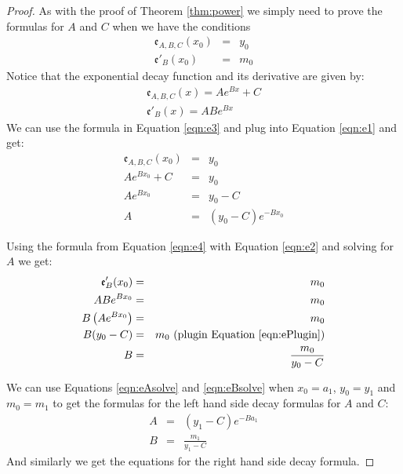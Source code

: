 \documentclass[10pt]{article}
\begin{document}
\begin{proof}
As with the proof of Theorem \ref{thm:power} we simply need to prove the
formulas for $A$ and $C$ when we have the conditions
\begin{eqnarray}
\mathfrak{e}_{A,B,C}(x_0) &=& y_0 \label{eqn:e1}\\
\mathfrak{e}'_{B}(x_0) &=& m_0 \label{eqn:e2}
\end{eqnarray}
Notice that the exponential decay function and its derivative are given by:
\begin{eqnarray}
\mathfrak{e}_{A,B,C}(x) = Ae^{Bx}+C \label{eqn:e3}\\
\mathfrak{e}'_{B}(x) = ABe^{Bx} \label{eqn:e4}
\end{eqnarray}
We can use the formula in Equation \ref{eqn:e3} and plug into Equation \ref{eqn:e1}
and get:
\begin{eqnarray}
\mathfrak{e}_{A,B,C}(x_0) &=& y_0 \\
Ae^{Bx_0} + C &=& y_0 \\
Ae^{Bx_0} &=& y_0 - C \label{eqn:ePlugin}\\
A&=&(y_0-C)e^{-Bx_0} \label{eqn:eAsolve}
\end{eqnarray}

Using the formula from Equation \ref{eqn:e4} with Equation \ref{eqn:e2} and
solving for $A$ we get:
\begin{eqnarray}
\mathfrak{e}'_{B}(x_0) &=& m_0 \\
ABe^{Bx_0} &=& m_0 \\
B \left(Ae^{Bx_0} \right)&=& m_0 \\
B(y_0-C) &=&m_0 \hbox{ (plugin Equation \ref{eqn:ePlugin})} \\
B &=& \frac{m_0}{y_0-C} \label{eqn:eBsolve}
\end{eqnarray}

We can use Equations \ref{eqn:eAsolve} and \ref{eqn:eBsolve} when $x_0=a_1$,
$y_0=y_1$ and $m_0=m_1$ to get the formulas for the left hand side decay formulas
for $A$ and $C$:
\begin{eqnarray*}
A&=&(y_1-C)e^{-Ba_1}\\
B &=& \frac{m_1}{y_1-C}
\end{eqnarray*}
And similarly we get the equations for the right hand side decay formula.
\end{proof}
%
%
\end{document}
